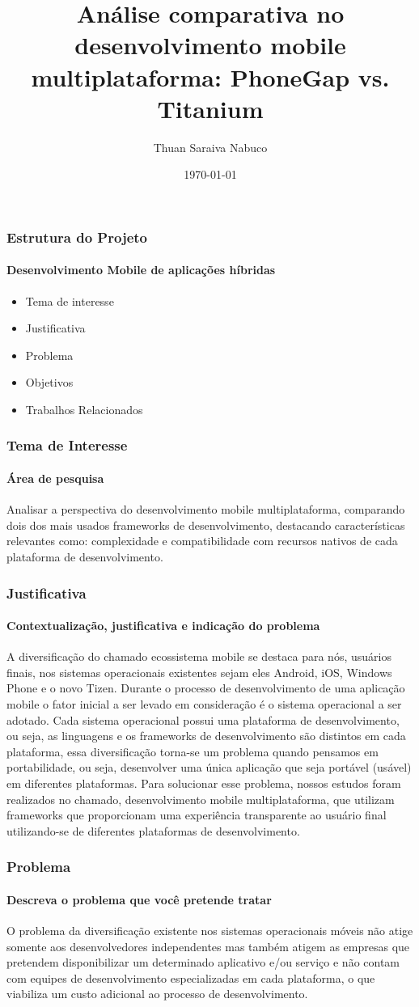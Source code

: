 \documentclass[10pt]{beamer}
\title{Análise comparativa no desenvolvimento mobile multiplataforma: PhoneGap vs. Titanium}
\author{Thuan Saraiva Nabuco}
\institute{Universidade Estadual do Ceará}
\date{\today}
\begin{document}
\titlepage
\begin{frame}
	\frametitle{Estrutura do Projeto}
	\framesubtitle{Desenvolvimento Mobile de aplicações híbridas}
	\begin{itemize}
		\item Tema de interesse
		\item Justificativa
		\item Problema
		\item Objetivos
		\item Trabalhos Relacionados
	\end{itemize}
\end{frame}

\begin{frame}
	\frametitle{Tema de Interesse}
	\framesubtitle{Área de pesquisa}
	Analisar a perspectiva do desenvolvimento mobile multiplataforma, comparando dois dos mais usados frameworks de desenvolvimento, destacando características relevantes como: complexidade e compatibilidade com recursos nativos de cada plataforma de desenvolvimento.
\end{frame}

\begin{frame}[t]
	\frametitle{Justificativa}
	\framesubtitle{Contextualização, justificativa e indicação do problema}
	 A diversificação do chamado ecossistema mobile se destaca para nós, usuários finais, nos sistemas operacionais existentes sejam eles Android, iOS, Windows Phone e o novo Tizen. Durante o processo de desenvolvimento de uma aplicação mobile o fator inicial a ser levado em consideração é o sistema operacional a ser adotado. Cada sistema operacional possui uma plataforma de desenvolvimento, ou seja, as linguagens e os frameworks de desenvolvimento são distintos em cada plataforma, essa diversificação torna-se um problema quando pensamos em portabilidade, ou seja, desenvolver uma única aplicação que seja portável (usável) em diferentes plataformas. Para solucionar esse problema, nossos estudos foram realizados no chamado, desenvolvimento mobile multiplataforma, que utilizam frameworks que proporcionam uma experiência transparente ao usuário final utilizando-se de diferentes plataformas de desenvolvimento. 
\end{frame}

\begin{frame}
	\frametitle{Problema}
	\framesubtitle{Descreva o problema que você pretende tratar}
	O problema da diversificação existente nos sistemas operacionais móveis não atige somente aos desenvolvedores independentes mas também atigem as empresas que pretendem disponibilizar um determinado aplicativo e/ou serviço e não contam com equipes de desenvolvimento especializadas em cada plataforma, o que viabiliza um custo adicional ao processo de desenvolvimento.
\end{frame}
\end{document}
